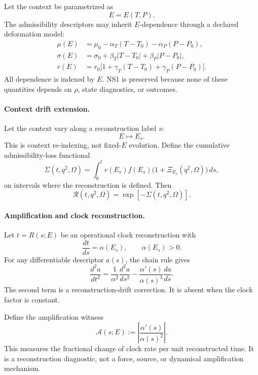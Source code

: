 \documentclass[aps,prx,onecolumn,11pt]{revtex4-2}
\theoremstyle{plain}
\theoremstyle{definition}
\theoremstyle{remark}
\begin{document}
Let the context be parametrized as
\[
E=E(T,P).
\]
The admissibility descriptors may inherit \(E\)-dependence through a
declared deformation model:
\begin{align}
\mu(E)
&=
\mu_0-\alpha_T(T-T_0)-\alpha_P(P-P_0),
\nonumber\\
\sigma(E)
&=
\sigma_0+\beta_T|T-T_0|+\beta_P|P-P_0|,
\label{eq:toy_unified_deformation}\\
r(E)
&=
r_0\bigl[1+\gamma_T(T-T_0)+\gamma_P(P-P_0)\bigr].
\nonumber
\end{align}
All dependence is indexed by \(E\). NS1 is preserved because none of
these quantities depends on \(\rho\), state diagnostics, or outcomes.

\paragraph{Context drift extension.}

Let the context vary along a reconstruction label \(s\):
\[
E\longmapsto E_s.
\]
This is context re-indexing, not fixed-\(E\) evolution. Define the
cumulative admissibility-loss functional
\begin{equation}
\Sigma(t,q^2,\Omega)
=
\int_0^t
r(E_s)f(E_s)
\bigl(1+\Xi_{E_s}(q^2,\Omega)\bigr)\,ds,
\label{eq:toy_unified_sigma}
\end{equation}
on intervals where the reconstruction is defined. Then
\begin{equation}
\mathcal R(t,q^2,\Omega)
=
\exp[-\Sigma(t,q^2,\Omega)].
\end{equation}

\paragraph{Amplification and clock reconstruction.}

Let \(t=R(s;E)\) be an operational clock reconstruction with
\begin{equation}
\frac{dt}{ds}=\alpha(E_s),
\qquad
\alpha(E_s)>0.
\end{equation}
For any differentiable descriptor \(a(s)\), the chain rule gives
\begin{equation}
\frac{d^2a}{dt^2}
=
\frac{1}{\alpha^2}\frac{d^2a}{ds^2}
-
\frac{\alpha'(s)}{\alpha(s)^3}
\frac{da}{ds}.
\label{eq:toy_unified_amplification}
\end{equation}
The second term is a reconstruction-drift correction. It is absent
when the clock factor is constant.

Define the amplification witness
\begin{equation}
\mathcal A(s;E)
:=
\left|
\frac{\alpha'(s)}{\alpha(s)^2}
\right|.
\label{eq:toy_unified_amp_factor}
\end{equation}
This measures the fractional change of clock rate per unit
reconstructed time. It is a reconstruction diagnostic, not a force,
source, or dynamical amplification mechanism.
\end{document}
